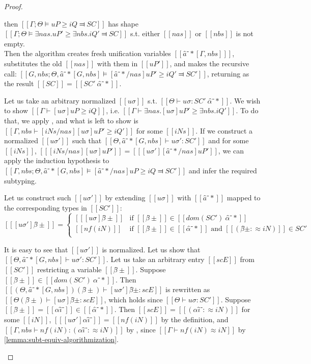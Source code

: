 \begin{proof}
\begin{caseof}
    \item \label{case:pos-subt-soundness:exists}
        then
        $[[Γ ; Θ ⊨ uP ≥ iQ ⫤ SC]]$ has shape $[[Γ;Θ ⊨ ∃nas.uP' ≥ ∃nbs.iQ' ⫤ SC]]$ s.t. either 
        $[[nas]]$ or $[[nbs]]$ is not empty.\\
        Then the algorithm creates fresh unification variables $[[â⁻*[Γ,nbs] ]]$, 
        substitutes the old $[[nas]]$ with them in $[[uP']]$, and makes the recursive call:
        $[[G, nbs; Θ, â⁻*[G, nbs] ⊨ [â⁻*/nas] uP' ≥ iQ' ⫤ SC']]$, returning as the result
        $[[SC]] = [[SC' \ {α̂⁻*}]]$.

        Let us take an arbitrary normalized $[[uσ]]$ s.t. $[[Θ ⊢ uσ : SC' \ {α̂⁻*}]]$.
        We wish to show $[[Γ ⊢ [uσ]uP ≥ iQ]]$, i.e. $[[Γ ⊢ ∃nas.[uσ]uP' ≥ ∃nbs.iQ']]$.
        To do that, we apply , and what is left to show is
        $[[Γ, nbs ⊢ [iNs/nas][uσ]uP' ≥ iQ']]$ for some $[[iNs]]$.
        If we construct a normalized $[[uσ']]$ such that $[[Θ, â⁻*[G, nbs] ⊢ uσ' : SC']]$
        and for some $[[iNs]]$, $[[ [iNs/nas][uσ]uP' ]] = [[ [uσ'][â⁻*/nas]uP' ]]$,
        we can apply the induction hypothesis to 
        $[[Γ, nbs; Θ, â⁻*[G, nbs] ⊨ [â⁻*/nas] uP ≥ iQ ⫤ SC']]$ and infer 
        the required subtyping.

        Let us construct such $[[uσ']]$ by extending $[[uσ]]$ with $[[â⁻*]]$
        mapped to the corresponding types in $[[SC']]$:
        $$
        [[ [uσ']β̂± ]]  = 
            \begin{cases}
               [[ [uσ]β̂± ]] & \text{if } [[β̂±]] \in [[dom(SC') \ {α̂⁻*}]]  \\
               [[ nf(iN) ]] & \text{if } [[β̂±]] \in [[α̂⁻*]] \text{ and } [[(β̂± :≈ iN)]] \in SC' \\
            \end{cases}
        $$

        It is easy to see that $[[uσ']]$ is normalized.
        Let us show that $[[Θ, â⁻*[G, nbs] ⊢ uσ' : SC']]$.
        Let us take an arbitrary entry $[[scE]]$ from $[[SC']]$ restricting a variable $[[β̂±]]$.
        Suppose $[[β̂±]] \in [[dom(SC') \ {α̂⁻*}]]$. Then
        $[[ (Θ, â⁻*[G, nbs])(β̂±) ⊢ [uσ']β̂± : scE ]]$ is
        rewritten as $[[ Θ(β̂±) ⊢ [uσ]β̂± : scE ]]$, which holds since $[[Θ ⊢ uσ : SC']]$.
        Suppose $[[β̂±]] = [[αî⁻]] \in [[α̂⁻*]]$. Then
        $[[scE]] = [[(αî⁻ :≈ iN)]]$ for some $[[iN]]$, 
        $[[ [uσ']αî⁻ ]] = [[ nf(iN) ]]$ by the definition,
        and $[[ Γ, nbs ⊢ nf(iN) : (αî⁻ :≈ iN) ]]$ by ,
        since $[[Γ ⊢ nf(iN) ≈ iN]]$ by \cref{lemma:subt-equiv-algorithmization}.


\end{caseof}
\end{proof}
